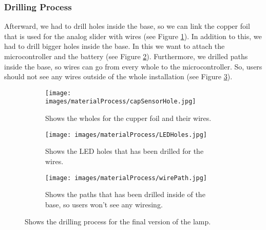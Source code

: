 \documentclass[04.3_buildingProcess.tex]{subfiles}
\begin{document}
    \subsubsection{Drilling Process}
    \noindent
    Afterward, we had to drill holes inside the base, so we can link the copper foil that is 
    used for the analog slider with wires (see Figure \ref{fig:capSensorHole}). In addition to 
    this, we had to drill bigger holes inside the base. In this we want to attach the 
    microcontroller and the battery (see Figure \ref{fig:LEDHoles}). Furthermore, we drilled 
    paths inside the base, so wires can go from every whole to the microcontroller. So, users 
    should not see any wires outside of the whole installation (see Figure \ref{fig:wirePath}).

    \begin{figure}[H]
        \centering
        \begin{subfigure}{.45\textwidth}
        \centering
        \texttt{[image: images/materialProcess/capSensorHole.jpg]}
        \caption{Shows the wholes for the cupper foil and their wires.}
        \label{fig:capSensorHole}
        \vspace{6mm}
        \end{subfigure}
        \medskip
        \hspace{1mm}
        \begin{subfigure}{.45\textwidth}
            \centering
            \texttt{[image: images/materialProcess/LEDHoles.jpg]}
            \caption{Shows the LED holes that has been drilled for the wires.}
            \label{fig:LEDHoles}
            \vspace{6mm}
        \end{subfigure}
        \hspace{1mm}
        \begin{subfigure}{.45\textwidth}
            \centering
            \texttt{[image: images/materialProcess/wirePath.jpg]}
            \caption{Shows the paths that has been drilled inside of the base, so 
            users won't see any wiresing.}
            \label{fig:wirePath}
            \vspace{6mm}
        \end{subfigure}
        \caption{Shows the drilling process for the final version of the lamp.}
        \label{fig:drillingProcess}
    \end{figure}
\end{document}
